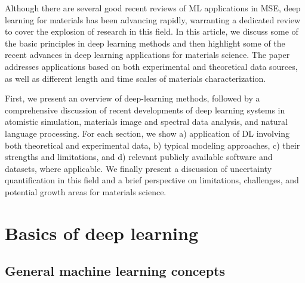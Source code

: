 \documentclass[pdflatex,sn-mathphys]{sn-jnl}%
\theoremstyle{thmstyleone}%
\theoremstyle{thmstyletwo}%
\theoremstyle{thmstylethree}%
\begin{document}
Although there are several good recent reviews of ML applications in MSE, deep learning for materials has been advancing rapidly, warranting a dedicated review to cover the explosion of research in this field.  In this article, we discuss some of the basic principles in deep learning methods and then highlight some of the recent advances in deep learning applications for materials science. The paper addresses applications based on both experimental and theoretical data sources, as well as different length and time scales of materials characterization. 

First, we present an overview of deep-learning methods, followed by a comprehensive discussion of recent developments of deep learning systems in atomistic simulation, materials image and spectral data analysis, and natural language processing. For each section, we show a) application of DL involving both theoretical and experimental data, b) typical modeling approaches, c) their strengths and limitations, and d) relevant publicly available software and datasets, where applicable. We finally present a discussion of uncertainty quantification in this field and a brief perspective on limitations, challenges, and potential growth areas for materials science. 




\section{Basics of deep learning}\label{sec:basics}

\subsection{General machine learning concepts}\label{sec:general-concepts}
\end{document}
